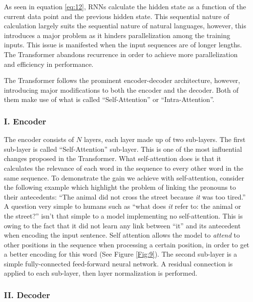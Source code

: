 As seen in equation \ref{eq:12}, \ac{RNN}s calculate the hidden state as a function of the current data point and the previous hidden state. This sequential nature of calculation largely suits the sequential nature of natural languages, however, this introduces a major problem as it hinders parallelization among the training inputs. This issue is manifested when the input sequences are of longer lengths. The Transformer abandons recurrence in order to achieve more parallelization and efficiency in performance.




The Transformer follows the prominent encoder-decoder architecture, however, introducing major modifications to both the encoder and the decoder. Both of them make use of what is called \enquote{Self-Attention} or \enquote{Intra-Attention}.


\subsubsection{I. Encoder} 
\label{bg:s4_sub3_subsub2}

The encoder consists of $N$ layers, each layer made up of two sub-layers. The first sub-layer is called  \enquote{Self-Attention} sub-layer. This is one of the most influential changes proposed in the Transformer. 
What self-attention does is that it calculates the relevance of each word in the sequence to every other word in the same sequence. 
To demonstrate the gain we achieve with self-attention, consider the following example which highlight the problem of linking the pronouns to their antecedents: \enquote{The animal did not cross the street because \textit{it} was too tired.} A question very simple to humans such as \enquote{what does \textit{it} refer to: the animal or the street?} isn't that simple to a model implementing no self-attention. 
This is owing to the fact that it did not learn any link between \enquote{it} and its antecedent when encoding the input sentence.
Self attention allows the model to \textit{attend} to other positions in the sequence when processing a certain position, in order to get a better encoding for this word (See Figure \ref{Fig:9}). 
The second sub-layer is a simple fully-connected feed-forward neural network. A residual connection \cite{he2016deep} is applied to each sub-layer, then layer normalization \cite{ba2016layer} is performed.




\subsubsection{II. Decoder} 
\label{bg:s4_sub3_subsub3}

